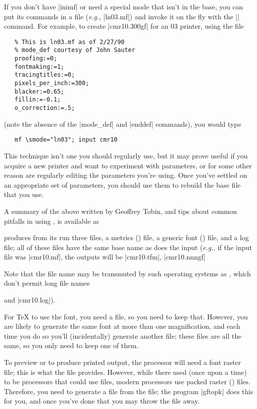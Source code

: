 If you don't have \ProgName|inimf| or need a special mode that isn't
in the base, you can put its commands in a file (\emph{e.g.},
\File|ln03.mf|) and invoke it on the fly with the |\smode| command.
For example, to create \File|cmr10.300gf| for an 03 printer, using
the file
\begin{verbatim}
   % This is ln03.mf as of 2/27/90
   % mode_def courtesy of John Sauter
   proofing:=0;
   fontmaking:=1;
   tracingtitles:=0;
   pixels_per_inch:=300;
   blacker:=0.65;
   fillin:=-0.1;
   o_correction:=.5;
\end{verbatim}
(note the absence of the |mode_def| and |enddef| commands), you would
type
\begin{verbatim}
   mf \smode="ln03"; input cmr10
\end{verbatim}
This technique isn't one you should regularly use, but it may
prove useful if you acquire a new printer and want to experiment with
parameters, or for some other reason are regularly editing the
parameters you're using.  Once you've settled on an appropriate set of
parameters, you should use them to rebuild the base file that you use.

A summary of the above written by Geoffrey Tobin, and tips about
common pitfalls in using \MF{}, is available as 


\MF{} produces from its run three files, a metrics () file, a
generic font () file, and a log file; all of these files have the
same base name as does the input (\emph{e.g.}, if the input file was
\File|cmr10.mf|, the outputs will be \File|cmr10.tfm|,
\File|cmr10.nnngf|\begin{footnoteenv}
                    Note that the file name may be transmuted by such
                    operating systems as \MSDOS{}, which don't permit
                    long file names
                  \end{footnoteenv}
and \File|cmr10.log|).

For \TeX{} to use the font, you need a  file, so you need
to keep that.  However, you are likely to generate the same font
at more than one magnification, and each time you do so you'll
(incidentally) generate another  file; these files are
all the same, so you only need to keep one of them.

To preview or to produce printed output, the  processor will need a
font raster file; this is what the  file provides.  However, while
there used (once upon a time) to be  processors that could use
 files, modern processors use packed raster () files.
Therefore, you need to generate a  file from the  file; the
program \ProgName|gftopk| does this for you, and once you've done that you
may throw the  file away.

